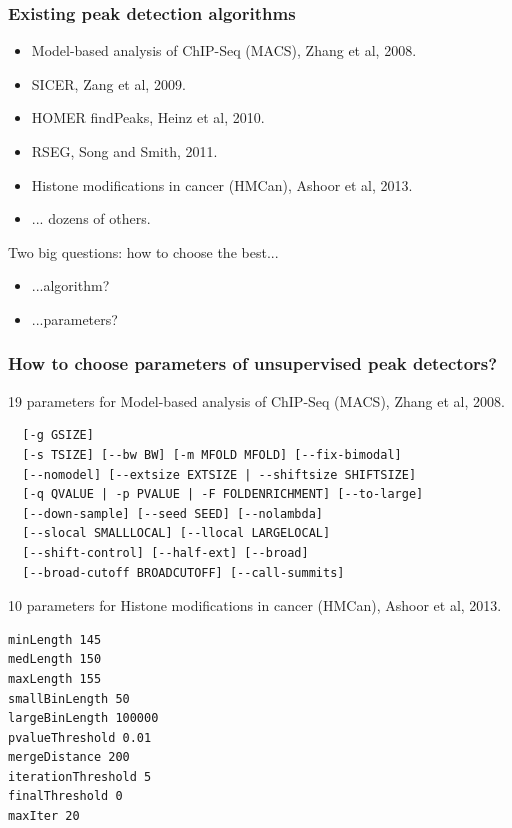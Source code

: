 \documentclass{beamer}
\begin{document}
\begin{frame}
  \frametitle{Existing peak detection algorithms}
  \begin{itemize}
  \item Model-based analysis of ChIP-Seq (MACS), Zhang et al, 2008.
  \item SICER, Zang et al, 2009.
  \item HOMER findPeaks, Heinz et al, 2010.
  \item RSEG, Song and Smith, 2011.
  \item Histone modifications in cancer (HMCan), Ashoor et al, 2013.
  \item ... dozens of others.
  \end{itemize}
  Two big questions: how to choose the best...
  \begin{itemize}
  \item ...algorithm?
  \item ...parameters?
  \end{itemize}
\end{frame}

\begin{frame}[fragile]
  \frametitle{How to choose parameters of unsupervised peak
    detectors?}
\scriptsize
19 parameters for Model-based analysis of ChIP-Seq (MACS), Zhang et al, 2008.
\begin{verbatim}
  [-g GSIZE]
  [-s TSIZE] [--bw BW] [-m MFOLD MFOLD] [--fix-bimodal]
  [--nomodel] [--extsize EXTSIZE | --shiftsize SHIFTSIZE]
  [-q QVALUE | -p PVALUE | -F FOLDENRICHMENT] [--to-large]
  [--down-sample] [--seed SEED] [--nolambda]
  [--slocal SMALLLOCAL] [--llocal LARGELOCAL]
  [--shift-control] [--half-ext] [--broad]
  [--broad-cutoff BROADCUTOFF] [--call-summits]
\end{verbatim}
10 parameters for Histone modifications in cancer (HMCan),
Ashoor et al, 2013.
\begin{verbatim}
minLength 145
medLength 150
maxLength 155
smallBinLength 50
largeBinLength 100000
pvalueThreshold 0.01
mergeDistance 200
iterationThreshold 5
finalThreshold 0
maxIter 20
\end{verbatim}
\end{frame}
\end{document}
